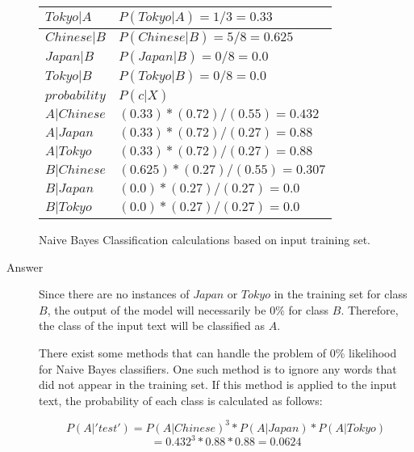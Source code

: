 \documentclass[12pt]{article}
\begin{document}
\begin{enumerate}
\begin{figure}[ht]
\begin{tabular}{|l|l|}
                  $Tokyo|A$          & $P(Tokyo|A) = 1/3 = 0.33$           \\
                  \hline
                  $Chinese|B$        & $P(Chinese|B) = 5/8 = 0.625$        \\
                  $Japan|B$          & $P(Japan|B) = 0/8 = 0.0$            \\
                  $Tokyo|B$          & $P(Tokyo|B) = 0/8 = 0.0$            \\
                  \hline\hline
                  $probability$      & $P(c|X)$                            \\
                  \hline
                  $A|Chinese$        & $(0.33) * (0.72) / (0.55) = 0.432$  \\
                  $A|Japan$          & $(0.33) * (0.72) / (0.27) = 0.88$   \\
                  $A|Tokyo$          & $(0.33) * (0.72) / (0.27) = 0.88$   \\
                  \hline
                  $B|Chinese$        & $(0.625) * (0.27) / (0.55) = 0.307$ \\
                  $B|Japan$          & $(0.0) * (0.27) / (0.27) = 0.0$     \\
                  $B|Tokyo$          & $(0.0) * (0.27) / (0.27) = 0.0$     \\
                  \hline\hline
              \end{tabular}
              \caption{Naive Bayes Classification calculations based on input training set.}
          \end{figure}
          \begin{description}
              \item[Answer] Since there are no instances of $Japan$ or $Tokyo$
                  in the training set for class $B$, the output of the model
                  will necessarily be $0\%$ for class $B$. Therefore, the class
                  of the input text will be classified as $A$.

                  There exist some methods that can handle the problem of $0\%$
                  likelihood for Naive Bayes classifiers. One such method is to
                  ignore any words that did not appear in the training set. If
                  this method is applied to the input text, the probability of
                  each class is calculated as follows:

                  \begin{equation}
                      P(A|'test') = P(A|Chinese)^3 * P(A|Japan) * P(A|Tokyo)
                  \end{equation}
                  \begin{equation*}
                      = 0.432^3 * 0.88 * 0.88 = 0.0624
                  \end{equation*}


\end{description}
\end{enumerate}
\end{document}
